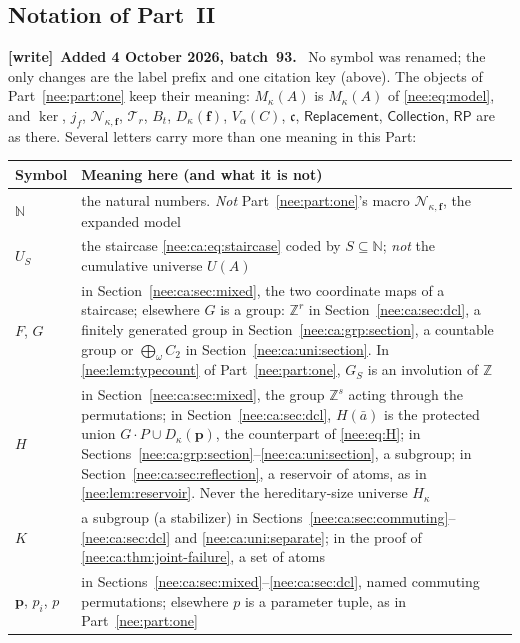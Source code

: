 \documentclass[11pt,letterpaper]{article}
\numberwithin{equation}{section}
\theoremstyle{plain}
\theoremstyle{definition}
\theoremstyle{remark}
\newcommand{\Rep}{\mathsf{Replacement}}
\newcommand{\Coll}{\mathsf{Collection}}
\newcommand{\RP}{\mathsf{RP}}
\newcommand{\kerat}{\operatorname{ker}}
\newcommand{\cont}{\mathfrak c}
\newcommand{\Mk}{M_\kappa(A)}
\newcommand{\NN}{\mathbb N}
\newcommand{\ZZ}{\mathbb Z}
\newenvironment{writenote}[1][]{\par\smallskip\begingroup\small\raggedright
 \setlength{\parindent}{1.25em}\noindent\textbf{[write]}\if\relax\detokenize{#1}\relax\else~\textbf{#1.}\fi\ }%
 {\par\endgroup\smallskip}
\begin{document}
\subsection{Notation of Part~II}
\label{nee:ca:sec:notation}

\begin{writenote}[Added 4 October 2026, batch~93]
No symbol was renamed; the only changes are the label prefix and one citation key (above). The objects of Part~\ref{nee:part:one} keep their meaning: $\Mk$ is $M_\kappa(A)$ of \eqref{nee:eq:model}, and $\kerat$, $j_f$, $\mathcal N_{\kappa,\boldsymbol f}$, $\mathcal T_r$, $B_t$, $D_\kappa(\boldsymbol f)$, $V_\alpha(C)$, $\cont$, $\Rep$, $\Coll$, $\RP$ are as there. Several letters carry more than one meaning in this Part:
\begin{center}\small
\begin{tabular}{>{\raggedright\arraybackslash}p{}>{\raggedright\arraybackslash}p{}}
\toprule
Symbol & Meaning here (and what it is not)\\
\midrule
$\NN$ & the natural numbers. \emph{Not} Part~\ref{nee:part:one}'s macro $\mathcal N_{\kappa,\boldsymbol f}$, the expanded model\\
$U_S$ & the staircase \eqref{nee:ca:eq:staircase} coded by $S\subseteq\NN$; \emph{not} the cumulative universe $U(A)$\\
$F$, $G$ & in Section~\ref{nee:ca:sec:mixed}, the two coordinate maps of a staircase; elsewhere $G$ is a group: $\ZZ^r$ in Section~\ref{nee:ca:sec:dcl}, a finitely generated group in Section~\ref{nee:ca:grp:section}, a countable group or $\bigoplus_\omega C_2$ in Section~\ref{nee:ca:uni:section}. In \cref{nee:lem:typecount} of Part~\ref{nee:part:one}, $G_S$ is an involution of $\ZZ$\\
$H$ & in Section~\ref{nee:ca:sec:mixed}, the group $\ZZ^s$ acting through the permutations; in Section~\ref{nee:ca:sec:dcl}, $H(\bar a)$ is the protected union $G\cdot P\cup D_\kappa(\boldsymbol p)$, the counterpart of \eqref{nee:eq:H}; in Sections~\ref{nee:ca:grp:section}--\ref{nee:ca:uni:section}, a subgroup; in Section~\ref{nee:ca:sec:reflection}, a reservoir of atoms, as in \cref{nee:lem:reservoir}. Never the hereditary-size universe $H_\kappa$\\
$K$ & a subgroup (a stabilizer) in Sections~\ref{nee:ca:sec:commuting}--\ref{nee:ca:sec:dcl} and \cref{nee:ca:uni:separate}; in the proof of \cref{nee:ca:thm:joint-failure}, a set of atoms\\
$\boldsymbol p$, $p_i$, $p$ & in Sections~\ref{nee:ca:sec:mixed}--\ref{nee:ca:sec:dcl}, named commuting permutations; elsewhere $p$ is a parameter tuple, as in Part~\ref{nee:part:one}\\

\end{tabular}
\end{center}
\end{writenote}
\end{document}
